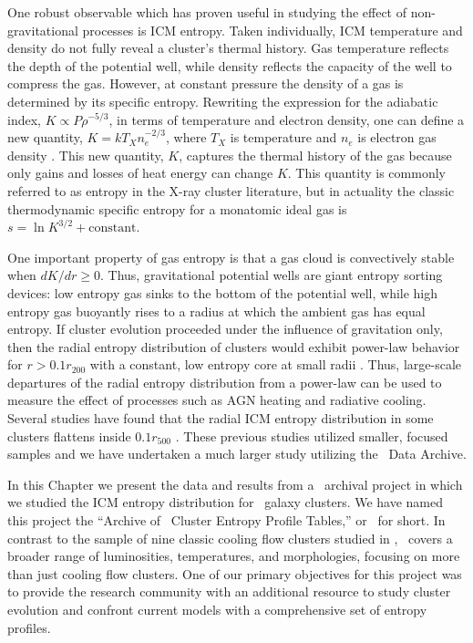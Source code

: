 One robust observable which has proven useful in studying the effect
of non-gravitational processes is ICM entropy. Taken individually, ICM
temperature and density do not fully reveal a cluster's thermal
history. Gas temperature reflects the depth of the potential well,
while density reflects the capacity of the well to compress the
gas. However, at constant pressure the density of a gas is determined
by its specific entropy. Rewriting the expression for the adiabatic
index, $K \propto P\rho^{-5/3}$, in terms of temperature and electron
density, one can define a new quantity, $K=kT_X n_e^{-2/3}$, where
$T_X$ is temperature and $n_e$ is electron gas density
\citep{1999Natur.397..135P, davies00}. This new quantity, $K$,
captures the thermal history of the gas because only gains and losses
of heat energy can change $K$. This quantity is commonly referred to
as entropy in the X-ray cluster literature, but in actuality the
classic thermodynamic specific entropy for a monatomic ideal gas is $s
= \ln K^{3/2} + \mathrm{constant}$.

One important property of gas entropy is that a gas cloud is
convectively stable when $dK/dr \geq 0$. Thus, gravitational potential
wells are giant entropy sorting devices: low entropy gas sinks to the
bottom of the potential well, while high entropy gas buoyantly rises
to a radius at which the ambient gas has equal entropy. If cluster
evolution proceeded under the influence of gravitation only, then the
radial entropy distribution of clusters would exhibit power-law
behavior for $r > 0.1 r_{200}$ with a constant, low entropy core at
small radii \citep{vkb05}. Thus, large-scale departures of the radial
entropy distribution from a power-law can be used to measure the
effect of processes such as AGN heating and radiative cooling. Several
studies have found that the radial ICM entropy distribution in some
clusters flattens inside $0.1 r_{500}$ \citep{1996ApJ...473..692D,
1999Natur.397..135P, davies00, 2003MNRAS.343..331P, piffaretti05,
radioquiet, d06, morandi07}. These previous studies utilized smaller,
focused samples and we have undertaken a much larger study utilizing
the \chandra\ Data Archive.

In this Chapter we present the data and results from a \chandra\
archival project in which we studied the ICM entropy distribution for
\entsuppnum\ galaxy clusters. We have named this project the ``Archive
of \chandra\ Cluster Entropy Profile Tables,'' or \accept\ for
short. In contrast to the sample of nine classic cooling flow clusters
studied in \citet[][hereafter D06]{d06}, \accept\ covers a broader
range of luminosities, temperatures, and morphologies, focusing on
more than just cooling flow clusters. One of our primary objectives
for this project was to provide the research community with an
additional resource to study cluster evolution and confront current
models with a comprehensive set of entropy profiles.

